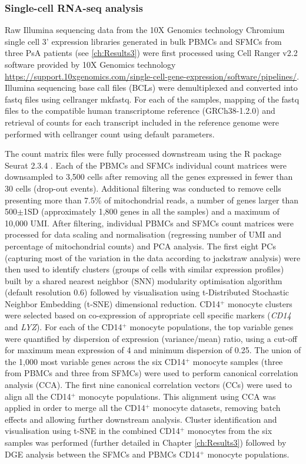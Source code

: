 \subsubsection{Single-cell RNA-seq analysis}
Raw Illumina sequencing data from the 10X Genomics technology Chromium single cell 3' expression libraries generated in bulk PBMCs and SFMCs from three PsA patients (see \ref{ch:Results3}) were first processed using Cell Ranger v2.2 software provided by 10X Genomics technology \url{https://support.10xgenomics.com/single-cell-gene-expression/software/pipelines/}. Illumina sequencing base call files (BCLs) were demultiplexed and converted into fastq files using cellranger mkfastq. For each of the samples, mapping of the fastq files to the compatible human transcriptome reference (GRCh38-1.2.0) and retrieval of counts for each transcript included in the reference genome were performed with cellranger count using default parameters. 

The count matrix files were fully processed downstream using the R package Seurat 2.3.4 \parencite{Butler2018}. Each of the PBMCs and SFMCs individual count matrices were downsampled to 3,500 cells after removing all the genes expressed in fewer than 30 cells (drop-out events). Additional filtering was conducted to remove cells presenting more than 7.5\% of mitochondrial reads, a number of genes larger than 500$\pm$1SD (approximately 1,800 genes in all the samples) and a maximum of 10,000 UMI. After filtering, individual PBMCs and SFMCs count matrices were processed for data scaling and normalisation (regressing number of UMI and percentage of mitochondrial counts) and PCA analysis. The first eight PCs (capturing most of the variation in the data according to jackstraw analysis) were then used to identify clusters (groups of cells with similar expression profiles) built by a shared nearest neighbor (SNN) modularity optimisation algorithm (default resolution 0.6) followed by visualisation using t-Distributed Stochastic Neighbor Embedding (t-SNE) dimensional reduction. CD14$^+$ monocyte clusters were selected based on co-expression of appropriate cell specific markers (\textit{CD14} and \textit{LYZ}). For each of the CD14$^+$ monocyte populations, the top variable genes were quantified by dispersion of expression (variance\slash mean) ratio, using a cut-off for maximum mean expression of 4 and minimum dispersion of 0.25. The union of the 1,000 most variable genes across the six CD14$^+$ monocyte samples (three from PBMCs and three from SFMCs) were used to perform canonical correlation analysis (CCA). The first nine canonical correlation vectors (CCs) were used to align all the CD14$^+$ monocyte populations. This alignment using CCA was applied in order to merge all the CD14$^+$ monocyte datasets, removing batch effects and allowing further downstream analysis. Cluster identification and visualisation using t-SNE in the combined CD14$^+$ monocytes from the six samples was performed (further detailed in Chapter \ref{ch:Results3}) followed by DGE analysis between the SFMCs and PBMCs CD14$^+$ monocyte populations. 




